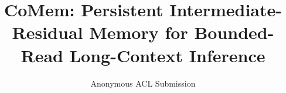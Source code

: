 \documentclass[11pt]{article}
\title{CoMem: Persistent Intermediate-Residual Memory for
Bounded-Read Long-Context Inference}
\author{Anonymous ACL Submission}
\begin{document}
\maketitle







\FloatBarrier

\FloatBarrier





\clearpage
\appendix
\raggedbottom


\end{document}
